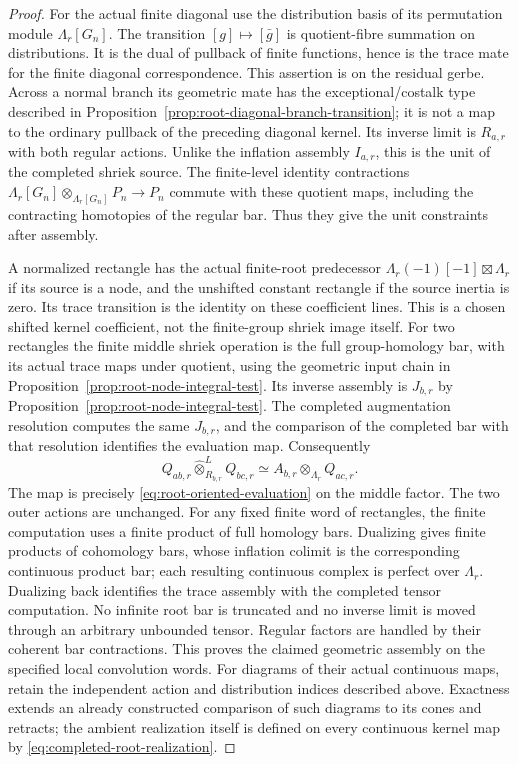 \documentclass[11pt]{article}
\theoremstyle{definition}
\theoremstyle{remark}
\begin{document}
\begin{proof}
For the actual finite diagonal use the distribution basis of its
permutation module $\Lambda_r[G_n]$.  The transition
$[g]\mapsto[\bar g]$ is quotient-fibre summation on distributions.
It is the dual of pullback of finite functions, hence is the trace
mate for the finite diagonal correspondence.  This assertion is
on the residual gerbe.  Across a normal branch its geometric mate
has the exceptional/costalk type described in
Proposition~\ref{prop:root-diagonal-branch-transition}; it is not a
map to the ordinary pullback of the preceding diagonal kernel.  Its inverse limit
is $R_{a,r}$ with both regular actions.  Unlike the inflation
assembly $I_{a,r}$, this is the unit of the completed shriek source.
The finite-level identity contractions
$\Lambda_r[G_n]\otimes_{\Lambda_r[G_n]}P_n\to P_n$ commute with
these quotient maps, including the contracting homotopies of the
regular bar.  Thus they give the unit constraints after assembly.

A normalized rectangle has the actual finite-root predecessor
$\Lambda_r(-1)[-1]\boxtimes\Lambda_r$ if its source is a node,
and the unshifted constant rectangle if the source inertia is zero.
Its trace transition is the identity on these coefficient lines.
This is a chosen shifted kernel coefficient, not the finite-group
shriek image itself.  For two rectangles the finite middle shriek
operation is the full group-homology bar, with its actual trace maps
under quotient, using the geometric input chain in
Proposition~\ref{prop:root-node-integral-test}.
Its inverse assembly is $J_{b,r}$ by
Proposition~\ref{prop:root-node-integral-test}.  The completed
augmentation resolution computes the same $J_{b,r}$, and the
comparison of the completed bar with that resolution identifies
the evaluation map.  Consequently
\begin{equation}
 Q_{ab,r}\widehat\otimes_{R_{b,r}}^L Q_{bc,r}
  \simeq A_{b,r}\otimes_{\Lambda_r}Q_{ac,r}.
 \label{eq:normalized-root-rectangles}
\end{equation}
The map is precisely \eqref{eq:root-oriented-evaluation} on the
middle factor.  The two outer actions are unchanged.  For any fixed
finite word of rectangles, the finite computation uses a finite
product of full homology bars.  Dualizing gives finite products of
cohomology bars, whose inflation colimit is the corresponding
continuous product bar; each resulting continuous complex is
perfect over $\Lambda_r$.  Dualizing back identifies the trace
assembly with the completed tensor computation.  No infinite
root bar is truncated and no inverse limit is moved through an
arbitrary unbounded tensor.  Regular factors are handled by their
coherent bar contractions.  This proves the claimed geometric
assembly on the specified local convolution words.  For diagrams
of their actual continuous maps, retain the independent action and
distribution indices described above.  Exactness extends an already
constructed comparison of such diagrams to its cones and retracts;
the ambient realization itself is defined on every continuous
kernel map by \eqref{eq:completed-root-realization}.


\end{proof}
\end{document}
